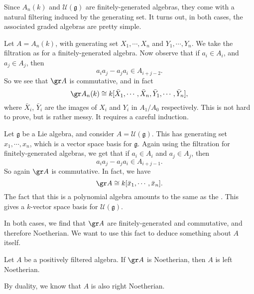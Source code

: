 \documentclass[a4paper]{article}
\begin{document}
Since $A_n(k)$ and $\mathcal{U}(\mathfrak{g})$ are finitely-generated algebras, they come with a natural filtering induced by the generating set. It turns out, in both cases, the associated graded algebras are pretty simple.
\begin{eg}
  Let $A = A_n(k)$, with generating set $X_1, \cdots, X_n$ and $Y_1, \cdots, Y_n$. We take the filtration as for a finitely-generated algebra. Now observe that if $a_i \in A_i$, and $a_j \in A_j$, then
  \[
    a_i a_j - a_j a_i \in A_{i + j - 2}.
  \]
  So we see that $\gr A$ is commutative, and in fact
  \[
    \gr A_n(k) \cong k[\bar{X}_1, \cdots, \bar{X}_n, \bar{Y}_1, \cdots, \bar{Y}_n],
  \]
  where $\bar{X}_i$, $\bar{Y}_i$ are the images of $X_i$ and $Y_i$ in $A_1/A_0$ respectively. This is not hard to prove, but is rather messy. It requires a careful induction.
\end{eg}

\begin{eg}
  Let $\mathfrak{g}$ be a Lie algebra, and consider $A = \mathcal{U}(\mathfrak{g})$. This has generating set $x_1, \cdots, x_n$, which is a vector space basis for $\mathfrak{g}$. Again using the filtration for finitely-generated algebras, we get that if $a_i \in A_i$ and $a_j \in A_j$, then
  \[
    a_i a_j - a_j a_i \in A_{i + j - 1}.
  \]
  So again $\gr A$ is commutative. In fact, we have
  \[
    \gr A \cong k[\bar{x}_1, \cdots, \bar{x}_n].
  \]
  The fact that this is a polynomial algebra amounts to the same as the . This gives a $k$-vector space basis for $\mathcal{U}(\mathfrak{g})$.
\end{eg}

In both cases, we find that $\gr A$ are finitely-generated and commutative, and therefore Noetherian. We want to use this fact to deduce something about $A$ itself.

\begin{lemma}
  Let $A$ be a positively filtered algebra. If $\gr A$ is Noetherian, then $A$ is left Noetherian.
\end{lemma}
By duality, we know that $A$ is also right Noetherian.
\end{document}
